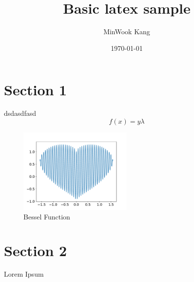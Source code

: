 \documentclass[11pt]{article}
\title{Basic latex sample}
\author{MinWook Kang}
\date{\today}
\begin{document}
\maketitle
\pagebreak



\section{Section 1}
\noindent
dsdasdfasd
\begin{equation}
    f(x) = y \lambda
\end{equation}

\begin{figure}[!ht]
  \centering
  \includegraphics[width=0.5\textwidth]{13.pdf}
  \caption{Bessel Function}
\end{figure}

\pagebreak
\section{Section 2}
Lorem Ipsum \\

\end{document}

